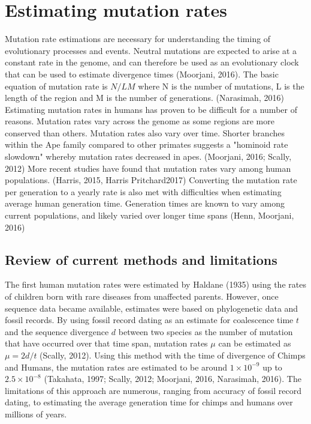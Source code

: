 \documentclass[
11pt, %
oneside, %
english, %
doublespacing, %
headsepline, %
]{MastersDoctoralThesis} %
\begin{document}
\chapter{Estimating mutation rates}

Mutation rate estimations are necessary for understanding the timing of evolutionary processes and events.
Neutral mutations are expected to arise at a constant rate in the genome, and can therefore be used as an evolutionary clock that can be used to estimate divergence times (Moorjani, 2016). 
The basic equation of mutation rate is $N / LM$ where N is the number of mutations, L is the length of the region and M is the number of generations. (Narasimah, 2016)
Estimating mutation rates in humans has proven to be difficult for a number of reasons.
Mutation rates vary across the genome as some regions are more conserved than others. 
Mutation rates also vary over time.
Shorter branches within the Ape family compared to other primates suggests a "hominoid rate slowdown" whereby mutation rates decreased in apes. (Moorjani, 2016; Scally, 2012)
More recent studies have found that mutation rates vary among human populations. (Harris, 2015, Harris Pritchard2017)
Converting the mutation rate per generation to a yearly rate is also met with difficulties when estimating average human generation time.
Generation times are known to vary among current populations, and likely varied over longer time spans (Henn, Moorjani, 2016)

\section{Review of current methods and limitations}

The first human mutation rates were estimated by Haldane (1935) using the rates of children born with rare diseases from unaffected parents.
However, once sequence data became available, estimates were based on phylogenetic data and fossil records.
By using fossil record dating as an estimate for coalescence time $t$ and the sequence divergence $d$ between two species as the number of mutation that have occurred over that time span, mutation rates $\mu$ can be estimated as $\mu = 2d/t$ (Scally, 2012). 
Using this method with the time of divergence of Chimps and Humans, the mutation rates are estimated to be around $1\times10^{-9}$ up to $2.5\times10^{-8}$ (Takahata, 1997; Scally, 2012; Moorjani, 2016, Narasimah, 2016).
The limitations of this approach are numerous, ranging from accuracy of fossil record dating, to estimating the average generation time for chimps and humans over millions of years.
\end{document}
